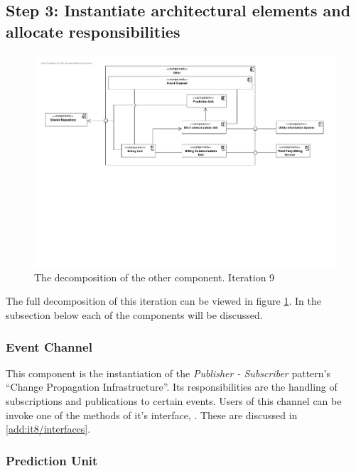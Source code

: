 \subsection{Step 3: Instantiate architectural elements and allocate responsibilities}
\label{add:it9/elements}

\begin{figure}[H]
	\begin{centering}
		\includegraphics[width=\textwidth]{figs/add-it9-elements.pdf}
		\caption{The decomposition of the other component. Iteration
		9}
		\label{fig:add/it9/decomposition}
	\end{centering}
\end{figure}

\npar The full decomposition of this iteration can be viewed in figure
\ref{fig:add/it9/decomposition}. In the subsection below each of the components
will be discussed. 

\subsubsection{Event Channel}

\npar This component is the instantiation of the \emph{Publisher - Subscriber}
pattern's ``Change Propagation Infrastructure''. Its responsibilities are the
handling of subscriptions and publications to certain events. Users of this
channel can be invoke one of the methods of it's interface,
. These are discussed in \ref{add:it8/interfaces}.

\subsubsection{Prediction Unit}

